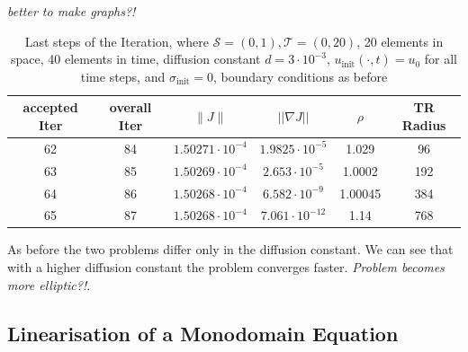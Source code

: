 \documentclass[../draft_1.tex]{subfiles}
\begin{document}
\textit{better to make graphs?!}
\begin{table}[ht!]
	\begin{center}
		\begin{tabular}{|c | c | c | c | c | c |} 
			\hline
			accepted Iter & overall Iter & $ \| J \|  $ & $|| \nabla J ||$ & $\rho $ & TR Radius \\ 
			\hline\hline
			62 & 84 & $1.50271 \cdot 10^{-4}$ & $1.9825 \cdot 10^{-5}$ &  1.029 & 96 \\ 
			\hline
			63 & 85 & $1.50269 \cdot 10^{-4}$ & $2.653 \cdot 10^{-5}$ & 1.0002 & 192 \\
			\hline
			64 & 86 & $1.50268 \cdot 10^{-4}$ & $6.582 \cdot 10^{-9}$ & 1.00045 & 384 \\
			\hline
			65 & 87 & $1.50268 \cdot 10^{-4}$ & $7.061 \cdot 10^{-12}$ & 1.14 & 768 \\
			\hline
			
		\end{tabular}
	\end{center}
	\caption{Last steps of the Iteration, where $\mathcal{S} = (0, 1), \mathcal{T} = (0, 20)$, 20 elements in space, 40 elements in time, diffusion constant $d=3 \cdot 10^{-3}$, $u_{\text{init}} (\cdot,t)= u_0$ for all time steps, and $\sigma_{\text{init}} = 0$, boundary conditions as before}
\end{table}

As before the two problems differ only in the diffusion constant. We can see that with a higher diffusion constant the problem converges faster. \textit{Problem becomes more elliptic?!}.

\subsection{Linearisation of a Monodomain Equation}
\end{document}
